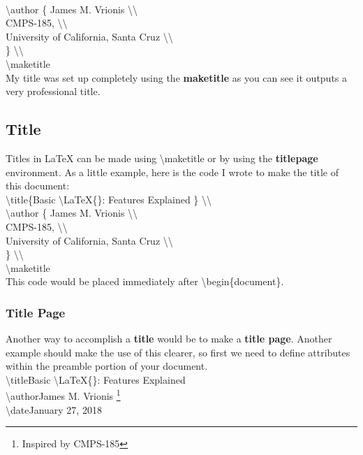 \\
\textbackslash{author} \{ James M. Vrionis \textbackslash \textbackslash \\
         CMPS-185, \textbackslash \textbackslash \\
         University of California, Santa Cruz \textbackslash \textbackslash \\
      \} \textbackslash \textbackslash \\
\textbackslash{maketitle}\\

My title was set up completely using the 
\textbf{maketitle} as you can see
it outputs a very professional title.


\subsection{Title}
Titles in \LaTeX{} can be made using \textbackslash{maketitle} or
by using the \textbf{titlepage} environment. As a little example,
here is the code I wrote to make the title of this document:\\

\textbackslash{title}\{Basic \textbackslash{LaTeX\{\}}: Features Explained \} 
\textbackslash \textbackslash \\
\textbackslash{author} \{ James M. Vrionis \textbackslash \textbackslash \\
         CMPS-185, \textbackslash \textbackslash \\
         University of California, Santa Cruz \textbackslash \textbackslash \\
      \} \textbackslash \textbackslash \\
\textbackslash{maketitle}\\

This code would be placed immediately after \textbackslash{begin\{document\}}.

\subsubsection{Title Page}
Another way to accomplish a \textbf{title} 
would be to make a \textbf{title page}. 
Another example should make the use of this clearer,
so first we need to define attributes within the
preamble portion of your document.\\ 

\textbackslash{title}{Basic \textbackslash{LaTeX\{\}}: Features Explained} \\
\textbackslash{author}James M. Vrionis \thanks{Inspired by CMPS-185} \\
\textbackslash{date}{January 27,  2018} \\

